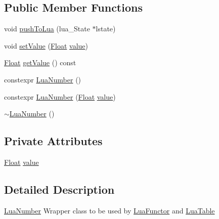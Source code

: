\subsection*{Public Member Functions}
\begin{DoxyCompactItemize}
\item 
void \hyperlink{classZeta_1_1LuaNumber_a20dd0dac6890fe253a106613b8095350}{push\+To\+Lua} (lua\+\_\+\+State $\ast$lstate)
\item 
void \hyperlink{classZeta_1_1LuaNumber_aea800e007d89a394c850e508fc736977}{set\+Value} (\hyperlink{namespaceZeta_a1e0a1265f9b3bd3075fb0fabd39088ba}{Float} \hyperlink{classZeta_1_1LuaNumber_a8c5f69af7e47bc7411c00c712d62646b}{value})
\item 
\hyperlink{namespaceZeta_a1e0a1265f9b3bd3075fb0fabd39088ba}{Float} \hyperlink{classZeta_1_1LuaNumber_a6b91d278eed317f90140e11409ef2e3f}{get\+Value} () const 
\item 
constexpr \hyperlink{classZeta_1_1LuaNumber_a5175eafdc66cf17ee5356aebdf8b77cf}{Lua\+Number} ()
\item 
constexpr \hyperlink{classZeta_1_1LuaNumber_aa0c1facf7f242f4d16c928e0f89d0592}{Lua\+Number} (\hyperlink{namespaceZeta_a1e0a1265f9b3bd3075fb0fabd39088ba}{Float} \hyperlink{classZeta_1_1LuaNumber_a8c5f69af7e47bc7411c00c712d62646b}{value})
\item 
\hyperlink{classZeta_1_1LuaNumber_a8eddcd79817fb7141d1bc53dc6e58cb0}{$\sim$\+Lua\+Number} ()
\end{DoxyCompactItemize}
\subsection*{Private Attributes}
\begin{DoxyCompactItemize}
\item 
\hyperlink{namespaceZeta_a1e0a1265f9b3bd3075fb0fabd39088ba}{Float} \hyperlink{classZeta_1_1LuaNumber_a8c5f69af7e47bc7411c00c712d62646b}{value}
\end{DoxyCompactItemize}


\subsection{Detailed Description}
\hyperlink{classZeta_1_1LuaNumber}{Lua\+Number} Wrapper class to be used by \hyperlink{classZeta_1_1LuaFunctor}{Lua\+Functor} and \hyperlink{classZeta_1_1LuaTable}{Lua\+Table} 

